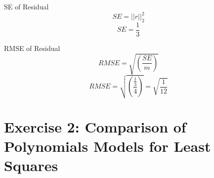 \documentclass[unicode,11pt,a4paper,oneside,numbers=endperiod,openany]{scrartcl}
\begin{document}
\begin{itemize}
    
    {SE of Residual}\\
    \begin{equation}
	    SE = ||r||_2^2
	 \end{equation}
	 \begin{equation}
	    SE = \frac{1}{3}
	 \end{equation}
    
    {RMSE of Residual}\\
    \begin{equation}
	    RMSE = \sqrt{(\frac{SE}{m})}
	 \end{equation}
	 \begin{equation}
	    RMSE = \sqrt{(\frac{\frac{1}{3}}{4})} = \sqrt{\frac{1}{12}}
	 \end{equation}
\end{itemize}


\section*{Exercise 2: Comparison of Polynomials Models for Least Squares}
\end{document}
